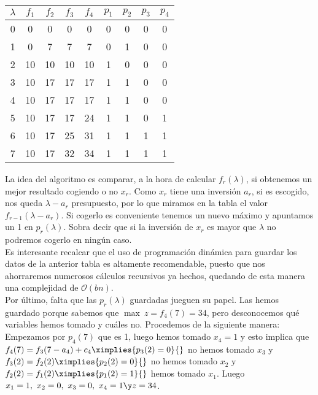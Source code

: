 \begin{ejem}
\begin{center}\begin{tabular}{|c||c|c|c|c||c|c|c|c|}
\hline
$\lambda$&$f_1$&$f_2$ & $f_3$ & $f_4$ & $p_1$ & $p_2$ & $p_3$ & $p_4$ \\ \hline\hline
0 & 0  & 0  & 0  & 0  & 0 & 0 & 0 & 0\\ \hline
1 & 0  & 7  & 7  & 7  & 0 & 1 & 0 & 0\\ \hline
2 & 10 & 10 & 10 & 10 & 1 & 0 & 0 & 0\\ \hline
3 & 10 & 17 & 17 & 17 & 1 & 1 & 0 & 0\\ \hline
4 & 10 & 17 & 17 & 17 & 1 & 1 & 0 & 0\\ \hline
5 & 10 & 17 & 17 & 24 & 1 & 1 & 0 & 1\\ \hline
6 & 10 & 17 & 25 & 31 & 1 & 1 & 1 & 1\\ \hline
7 & 10 & 17 & 32 & 34 & 1 & 1 & 1 & 1\\ \hline
\end{tabular}\end{center}

La idea del algoritmo es comparar, a la hora de calcular $f_r(\lambda)$, si obtenemos un mejor resultado cogiendo o no $x_r$. Como $x_r$ tiene una inversión $a_r$, si es escogido, nos queda $\lambda-a_r$ presupuesto, por lo que miramos en la tabla el valor $f_{r-1}(\lambda-a_r)$. Si cogerlo es conveniente tenemos un nuevo máximo y apuntamos un 1 en $p_r(\lambda)$. Sobra decir que si la inversión de $x_r$ es mayor que $\lambda$ no podremos cogerlo en ningún caso.\\

Es interesante recalcar que el uso de programación dinámica para guardar los datos de la anterior tabla es altamente recomendable, puesto que nos ahorraremos numerosos cálculos recursivos ya hechos, quedando de esta manera una complejidad de $\mathcal{O}(bn)$.\\

Por último, falta que las $p_r(\lambda)$ guardadas jueguen su papel. Las hemos guardado porque sabemos que $\max\ z=f_4(7)=34$, pero desconocemos qué variables hemos tomado y cuáles no. Procedemos de la siguiente manera:\\

Empezamos por $p_4(7)$ que es 1, luego hemos tomado $x_4=1$ y esto implica que\\
$f_4(7)=f_3(7-a_4) +c_4\ximplies{p_3(2)=0}{}$ no hemos tomado $x_3$ y $f_3(2)=f_2(2)\ximplies{p_2(2)=0}{}$ no hemos tomado $x_2$ y $f_2(2)=f_1(2)\ximplies{p_1(2)=1}{}$ hemos tomado $x_1$. Luego $x_1=1,\ x_2=0,\ x_3=0,\ x_4=1\y z=34$.
\end{ejem}